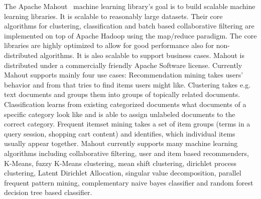 \documentclass{llncs}
\begin{document}
The Apache Mahout~\cite{mahoutscalable} machine learning library's goal is to build scalable machine learning libraries. It is scalable to reasonably large datasets. Their core algorithms for clustering, classification and batch based collaborative filtering are implemented on top of Apache Hadoop using the map/reduce paradigm. The core libraries are highly optimized to allow for good performance also for non-distributed algorithms.
It is also scalable to support business cases. Mahout is distributed under a commercially friendly Apache Software license.
Currently Mahout supports mainly four use cases: Recommendation mining takes users' behavior and from that tries to find items users might like. Clustering takes e.g. text documents and groups them into groups of topically related documents. Classification learns from existing categorized documents what documents of a specific category look like and is able to assign unlabeled documents to the correct category. Frequent itemset mining takes a set of item groups (terms in a query session, shopping cart content) and identifies, which individual items usually appear together.
Mahout currently supports many machine learning algorithms including collaborative filtering, user and item based recommenders, K-Means, fuzzy K-Means clustering, mean shift clustering, dirichlet process clustering, Latent Dirichlet Allocation, singular value decomposition, parallel frequent pattern mining, complementary naive bayes classifier and random forest decision tree based classifier.
\end{document}
